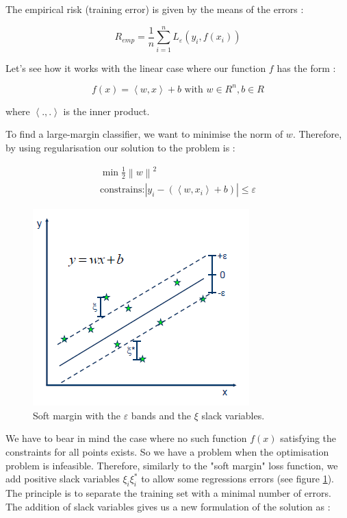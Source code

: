 \documentclass[11pt,a4paper,oneside]{book}
\begin{document}
The empirical risk (training error) is given by the means of the errors :

\begin{equation}
R_{emp} = \frac{1}{n} \sum_{i=1}^n L_{\varepsilon}\left ( y_{i}, f\left ( x_{i} \right ) \right )
\end{equation}

Let's see how it works with the linear case where our function $f$ has the form :

\begin{equation}
f\left ( x \right ) = \left \langle w, x \right \rangle + b  \text{ with } w \in R^{n}, b \in R
\end{equation}

where $\left \langle ., . \right \rangle$ is the inner product.

To find a large-margin classifier, we want to minimise the norm of $w$. Therefore, by using regularisation our solution to the problem is :

\begin{equation}
\begin{matrix}
\min \frac{1}{2} \left \| w \right \|^{2}\\
\text{constrains:}
 \left |  y_{i} - (\left \langle w, x_{i} \right \rangle + b) \right | \leq \varepsilon 
 \end{matrix}
\end{equation}


\begin{figure}[!h]
  \centering
    \includegraphics[scale=1]{img/SVR_2.png}
  \caption{Soft margin with the $\varepsilon$ bands and the $\xi$ slack variables. \cite{Sayad}}
  \label{fig:svr}
\end{figure}

We have to bear in mind the case where no such function $f\left ( x \right )$ satisfying the constraints for all points exists. So we have a problem when the optimisation problem is infeasible. Therefore, similarly to the "soft margin" loss function, we add positive slack variables $\xi_{i}\xi_{i}^{*}$ to allow some regressions errors (see figure \ref{fig:svr}). The principle is to separate the training set with a minimal number of errors. The addition of slack variables gives us a new formulation of the solution as :
\end{document}
